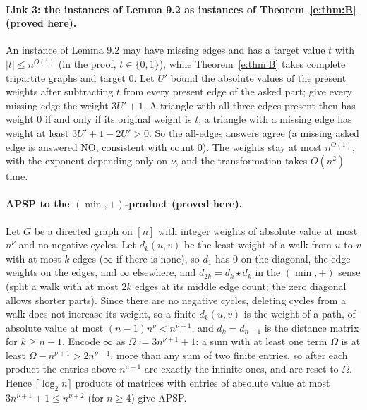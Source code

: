 \documentclass[11pt]{article}
\theoremstyle{definition}
\theoremstyle{remark}
\begin{document}
\paragraph{Link 3: the instances of Lemma 9.2 as instances of Theorem~\ref{e:thm:B} (proved here).} An instance of Lemma 9.2 may have missing edges and has a target value $t$ with $|t|\le n^{O(1)}$ (in the proof, $t\in\{0,1\}$), while Theorem~\ref{e:thm:B} takes complete tripartite graphs and target $0$. Let $U'$ bound the absolute values of the present weights after subtracting $t$ from every present edge of the asked part; give every missing edge the weight $3U'+1$. A triangle with all three edges present then has weight $0$ if and only if its original weight is $t$; a triangle with a missing edge has weight at least $3U'+1-2U'>0$. So the all-edges answers agree (a missing asked edge is answered NO, consistent with count $0$). The weights stay at most $n^{O(1)}$, with the exponent depending only on $\nu$, and the transformation takes $O(n^2)$ time.

\paragraph{APSP to the $(\min,+)$-product (proved here).} Let $G$ be a directed graph on $[n]$ with integer weights of absolute value at most $n^\nu$ and no negative cycles. Let $d_k(u,v)$ be the least weight of a walk from $u$ to $v$ with at most $k$ edges ($\infty$ if there is none), so $d_1$ has $0$ on the diagonal, the edge weights on the edges, and $\infty$ elsewhere, and $d_{2k}=d_k\star d_k$ in the $(\min,+)$ sense (split a walk with at most $2k$ edges at its middle edge count; the zero diagonal allows shorter parts). Since there are no negative cycles, deleting cycles from a walk does not increase its weight, so a finite $d_k(u,v)$ is the weight of a path, of absolute value at most $(n-1)n^\nu<n^{\nu+1}$, and $d_k=d_{n-1}$ is the distance matrix for $k\ge n-1$. Encode $\infty$ as $\Omega:=3n^{\nu+1}+1$: a sum with at least one term $\Omega$ is at least $\Omega-n^{\nu+1}>2n^{\nu+1}$, more than any sum of two finite entries, so after each product the entries above $n^{\nu+1}$ are exactly the infinite ones, and are reset to $\Omega$. Hence $\lceil\log_2n\rceil$ products of matrices with entries of absolute value at most $3n^{\nu+1}+1\le n^{\nu+2}$ (for $n\ge4$) give APSP.
\end{document}

